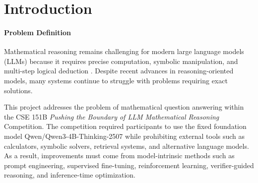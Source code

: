 \documentclass{article}
\begin{document}

\section{Introduction}
\label{sec:intro} 


\paragraph{Problem Definition}
Mathematical reasoning remains challenging for modern large language models (LLMs) because it requires precise computation, symbolic manipulation, and multi-step logical deduction \cite{lewkowycz2022minerva, wei2022cot}. Despite recent advances in reasoning-oriented models, many systems continue to struggle with problems requiring exact solutions.

This project addresses the problem of mathematical question answering within the CSE 151B \textit{Pushing the Boundary of LLM Mathematical Reasoning}  Competition. The competition required participants to use the fixed foundation model Qwen/Qwen3-4B-Thinking-2507 \cite{qwen3} while prohibiting external tools such as calculators, symbolic solvers, retrieval systems, and alternative language models. As a result, improvements must come from model-intrinsic methods such as prompt engineering, supervised fine-tuning, reinforcement learning, verifier-guided reasoning, and inference-time optimization.
\end{document}

